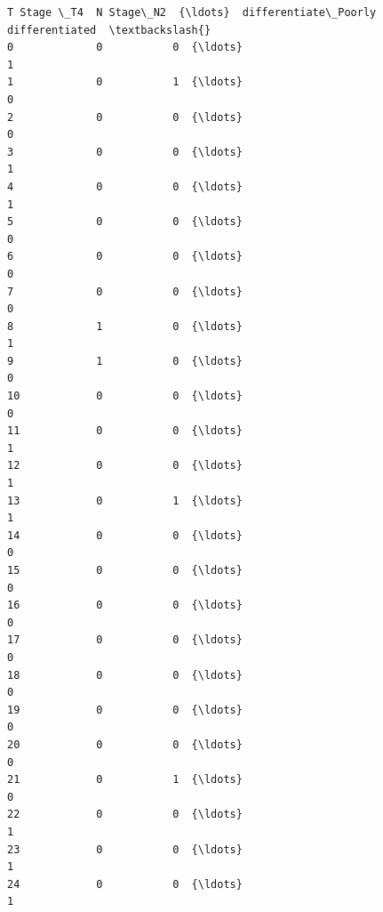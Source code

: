 \documentclass[11pt]{article}
\begin{document}
\begin{tcolorbox}[breakable, size=fbox, boxrule=.5pt, pad at break*=1mm, opacityfill=0]
\begin{Verbatim}[commandchars=\\\{\}]
    T Stage \_T4  N Stage\_N2  {\ldots}  differentiate\_Poorly differentiated  \textbackslash{}
0             0           0  {\ldots}                                    1
1             0           1  {\ldots}                                    0
2             0           0  {\ldots}                                    0
3             0           0  {\ldots}                                    1
4             0           0  {\ldots}                                    1
5             0           0  {\ldots}                                    0
6             0           0  {\ldots}                                    0
7             0           0  {\ldots}                                    0
8             1           0  {\ldots}                                    1
9             1           0  {\ldots}                                    0
10            0           0  {\ldots}                                    0
11            0           0  {\ldots}                                    1
12            0           0  {\ldots}                                    1
13            0           1  {\ldots}                                    1
14            0           0  {\ldots}                                    0
15            0           0  {\ldots}                                    0
16            0           0  {\ldots}                                    0
17            0           0  {\ldots}                                    0
18            0           0  {\ldots}                                    0
19            0           0  {\ldots}                                    0
20            0           0  {\ldots}                                    0
21            0           1  {\ldots}                                    0
22            0           0  {\ldots}                                    1
23            0           0  {\ldots}                                    1
24            0           0  {\ldots}                                    1


\end{Verbatim}
\end{tcolorbox}
\end{document}
